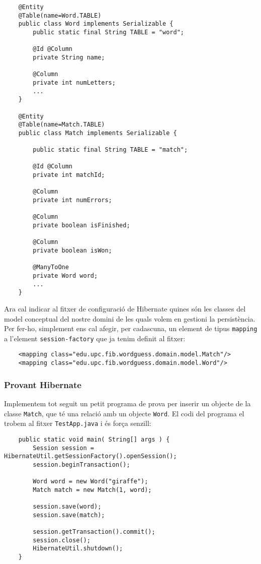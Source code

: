 \begin{verbatim}
    @Entity
    @Table(name=Word.TABLE)
    public class Word implements Serializable {
        public static final String TABLE = "word";
        
        @Id @Column
        private String name;
        
        @Column
        private int numLetters;
        ...
    }
    
    @Entity
    @Table(name=Match.TABLE)
    public class Match implements Serializable {
    
        public static final String TABLE = "match";
    	
        @Id @Column
        private int matchId;
    	
        @Column
        private int numErrors;
    	
        @Column
        private boolean isFinished;
    	
        @Column
        private boolean isWon;
    	
        @ManyToOne
        private Word word;
        ...
    }
\end{verbatim}

Ara cal indicar al fitxer de configuració de Hibernate quines són les classes del model conceptual del nostre domini de les quals volem en gestioni la persistència. Per fer-ho, simplement ens cal afegir, per cadascuna, un element de tipus \texttt{mapping} a l'element \texttt{session-factory} que ja tenim definit al fitxer:

\begin{verbatim}
    <mapping class="edu.upc.fib.wordguess.domain.model.Match"/>
    <mapping class="edu.upc.fib.wordguess.domain.model.Word"/>
\end{verbatim}

\subsubsection{Provant Hibernate}
Implementem tot seguit un petit programa de prova per inserir un objecte de la classe \texttt{Match}, que té una relació amb un objecte \texttt{Word}. El codi del programa el trobem al fitxer \texttt{TestApp.java} i és força senzill:

\begin{verbatim}
    public static void main( String[] args ) {
        Session session = HibernateUtil.getSessionFactory().openSession();
        session.beginTransaction();
        
        Word word = new Word("giraffe");
        Match match = new Match(1, word);
        
        session.save(word);
        session.save(match);
        
        session.getTransaction().commit();
        session.close();
        HibernateUtil.shutdown();
    }
\end{verbatim}

